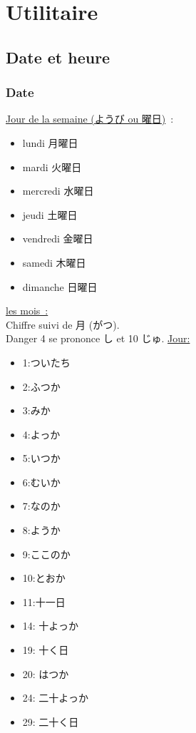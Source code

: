 \documentclass{article}
\begin{document}
\tableofcontents

\section{Utilitaire}
    \subsection{Date et heure}
\begin{CJK}{UTF8}{min}
    \subsubsection{Date}
    \underline{Jour de la semaine (ようび ou 曜日)}~:\\
    \begin{itemize}
        \item lundi 月曜日
        \item mardi 火曜日
        \item mercredi 水曜日
        \item jeudi 土曜日
        \item vendredi 金曜日
        \item samedi 木曜日
        \item dimanche 日曜日
    \end{itemize}
    \underline{les mois~:}\\
    Chiffre suivi de 月 (がつ). \\
    Danger 4 se prononce し et 10 じゅ.
    \underline{Jour:}\\
    \begin{itemize}
        \item 1:ついたち
        \item 2:ふつか 
        \item 3:みか
        \item 4:よっか
        \item 5:いつか
        \item 6:むいか
        \item 7:なのか
        \item 8:ようか
        \item 9:ここのか
        \item 10:とおか
        \item 11:十一日
        \item 14: 十よっか 
        \item 19: 十く日
        \item 20: はつか
        \item 24: 二十よっか
        \item 29: 二十く日
    \end{itemize}
\end{CJK}
\end{document}
